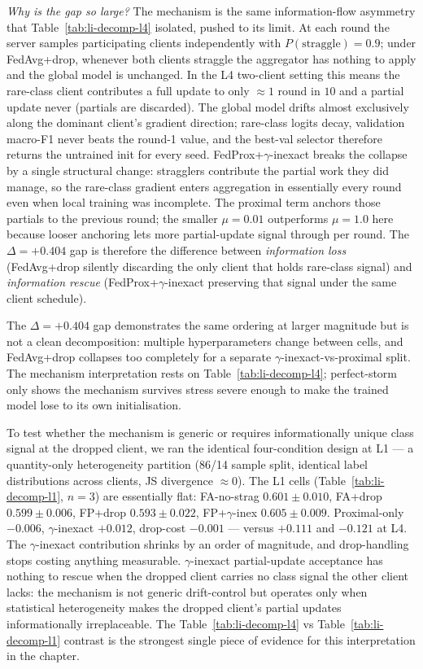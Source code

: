 \emph{Why is the gap so large?}
The mechanism is the same information-flow asymmetry that
Table~\ref{tab:li-decomp-l4} isolated, pushed to its limit. At each round
the server samples participating clients independently with
$P(\text{straggle}) = 0.9$; under FedAvg+drop, whenever both clients
straggle the aggregator has nothing to apply and the global model is
unchanged. In the L4 two-client setting this means the rare-class client
contributes a full update to only $\approx 1$ round in $10$ and a partial
update never (partials are discarded). The global model drifts almost
exclusively along the dominant client's gradient direction; rare-class
logits decay, validation macro-F1 never beats the round-1 value, and the
best-val selector therefore returns the untrained init for every seed.
FedProx+$\gamma$-inexact breaks the collapse by a single structural change:
stragglers contribute the partial work they did manage, so the rare-class
gradient enters aggregation in essentially every round even when local
training was incomplete. The proximal term anchors those partials to the
previous round; the smaller $\mu = 0.01$ outperforms $\mu = 1.0$ here
because looser anchoring lets more partial-update signal through per round.
The $\Delta = +0.404$ gap is therefore the difference between
\emph{information loss} (FedAvg+drop silently discarding the only client
that holds rare-class signal) and \emph{information rescue}
(FedProx+$\gamma$-inexact preserving that signal under the same client
schedule).

The $\Delta = +0.404$ gap demonstrates the same ordering at larger magnitude
but is not a clean decomposition: multiple hyperparameters change between
cells, and FedAvg+drop collapses too completely for a separate
$\gamma$-inexact-vs-proximal split. The mechanism interpretation rests on
Table~\ref{tab:li-decomp-l4}; perfect-storm only shows the mechanism
survives stress severe enough to make the trained model lose to its own
initialisation.

To test whether the mechanism is generic or requires informationally unique
class signal at the dropped client, we ran the identical four-condition
design at L1 --- a quantity-only heterogeneity partition (86/14 sample
split, identical label distributions across clients, JS divergence
$\approx 0$). The L1 cells (Table~\ref{tab:li-decomp-l1}, $n=3$) are
essentially flat: FA-no-strag $0.601 \pm 0.010$, FA+drop $0.599 \pm 0.006$,
FP+drop $0.593 \pm 0.022$, FP+$\gamma$-inex $0.605 \pm 0.009$.
Proximal-only $-0.006$, $\gamma$-inexact $+0.012$, drop-cost $-0.001$ ---
versus $+0.111$ and $-0.121$ at L4. The $\gamma$-inexact contribution
shrinks by an order of magnitude, and drop-handling stops costing anything
measurable. $\gamma$-inexact partial-update acceptance has nothing to
rescue when the dropped client carries no class signal the other client
lacks: the mechanism is not generic drift-control but operates only when
statistical heterogeneity makes the dropped client's partial updates
informationally irreplaceable. The Table~\ref{tab:li-decomp-l4} vs
Table~\ref{tab:li-decomp-l1} contrast is the strongest single piece of
evidence for this interpretation in the chapter.

